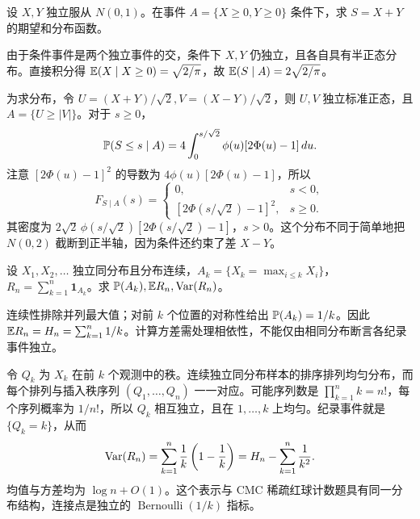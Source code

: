 \begin{example}[原题2：两个正态变量在第一象限内的和]\label{yau:2013-2}
设 $X,Y$ 独立服从 $N(0,1)$。在事件 $A=\{X\ge0,Y\ge0\}$ 条件下，求 $S=X+Y$ 的期望和分布函数。
\end{example}
\begin{solve}
由于条件事件是两个独立事件的交，条件下 $X,Y$ 仍独立，且各自具有半正态分布。直接积分得 $\mathbb E(X\mid X\ge0)=\sqrt{2/\pi}$，故 $\mathbb E(S\mid A)=2\sqrt{2/\pi}$。

为求分布，令 $U=(X+Y)/\sqrt2,V=(X-Y)/\sqrt2$，则 $U,V$ 独立标准正态，且 $A=\{U\ge|V|\}$。对于 $s\ge0$，
\[
\mathbb P(S\le s\mid A)=4\int_0^{s/\sqrt2}\phi(u)[2\Phi(u)-1]\,du.
\]
注意 $[2\Phi(u)-1]^2$ 的导数为 $4\phi(u)[2\Phi(u)-1]$，所以
\[
F_{S\mid A}(s)=\begin{cases}0,&s<0,\\{}[2\Phi(s/\sqrt2)-1]^2,&s\ge0.\end{cases}
\]
其密度为 $2\sqrt2\,\phi(s/\sqrt2)[2\Phi(s/\sqrt2)-1]$，$s>0$。这个分布不同于简单地把 $N(0,2)$ 截断到正半轴，因为条件还约束了差 $X-Y$。
\end{solve}

\begin{example}[原题3：纪录次数]\label{yau:2013-3}
设 $X_1,X_2,\ldots$ 独立同分布且分布连续，$A_k=\{X_k=\max_{i\le k}X_i\}$，$R_n=\sum_{k=1}^n\mathbf1_{A_k}$。求 $\mathbb P(A_k),\mathbb E R_n,\operatorname{Var}(R_n)$。
\end{example}
\begin{solve}
连续性排除并列最大值；对前 $k$ 个位置的对称性给出 $\mathbb P(A_k)=1/k$。因此 $\mathbb E R_n=H_n=\sum_{k=1}^n1/k$。计算方差需处理相依性，不能仅由相同分布断言各纪录事件独立。

令 $Q_k$ 为 $X_k$ 在前 $k$ 个观测中的秩。连续独立同分布样本的排序排列均匀分布，而每个排列与插入秩序列 $(Q_1,\ldots,Q_n)$ 一一对应。可能序列数是 $\prod_{k=1}^nk=n!$，每个序列概率为 $1/n!$，所以 $Q_k$ 相互独立，且在 $1,\ldots,k$ 上均匀。纪录事件就是 $\{Q_k=k\}$，从而
\[
\operatorname{Var}(R_n)=\sum_{k=1}^n\frac1k\left(1-\frac1k\right)=H_n-\sum_{k=1}^n\frac1{k^2}.
\]
均值与方差均为 $\log n+O(1)$。这个表示与 CMC 稀疏红球计数题具有同一分布结构，连接点是独立的 $\operatorname{Bernoulli}(1/k)$ 指标。
\end{solve}

